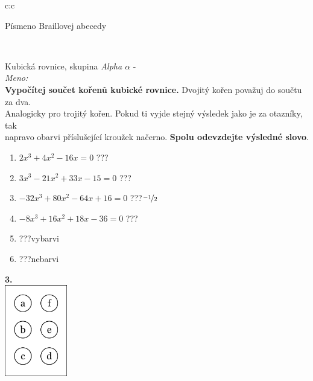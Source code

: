 \documentclass[10pt]{report}
\begin{document}
\begin{tabular}{c:c}
\begin{minipage}[c][99mm][t]{0.49\linewidth}
\begin{center}
\begin{minipage}{0.20\linewidth}
\begin{center}
{\small Písmeno Braillovej abecedy}
\end{center}
\end{minipage}
\end{center}
\end{minipage}
\\ \hdashline
\begin{minipage}[c][99mm][t]{0.49\linewidth}
\begin{center}
\vspace{7mm}
{\huge Kubická rovnice, skupina \textit{Alpha $\alpha$} -}\\[4.5mm]
\textit{Meno:}\phantom{xxxxxxxxxxxxxxxxxxxxxxxxxxxxxxxxxxxxxxxxxxxxxxxxxxxxxxxxxxxxxxxxx}\\[3.5mm]
\textbf{Vypočítej součet kořenů kubické rovnice.} Dvojitý kořen považuj do součtu za dva.\\Analogicky pro trojitý kořen. Pokud ti vyjde stejný výsledek jako je za otazníky, tak\\napravo obarvi příslušející kroužek načerno. \textbf{Spolu odevzdejte výsledné slovo}.\\[3mm]
\begin{minipage}{0.77\linewidth}
\begin{center}
\begin{varwidth}{\textwidth}
\begin{enumerate}
\large
\item $2x^3+4x^2-16x=0$\quad \dotfill\; ???\;\dotfill {}
\item $3x^3-21x^2+33x-15=0$\quad \dotfill\; ???\;\dotfill {}
\item $-32x^3+80x^2-64x+16=0$\quad \dotfill\; ???\;\dotfill \quad $\nicefrac{-1}{2}$
\item $-8x^3+16x^2+18x-36=0$\quad \dotfill\; ???\;\dotfill {}
\item \quad \dotfill\; ???\;\dotfill \quad vybarvi
\item \quad \dotfill\; ???\;\dotfill \quad nebarvi
\end{enumerate}
\end{varwidth}
\end{center}
\end{minipage}
\begin{minipage}{0.20\linewidth}
\begin{center}
{\Huge\bfseries 3.} \\[2mm]
\includegraphics[height=40mm]{../images/braille.png}

\end{center}
\end{minipage}
\end{center}
\end{minipage}
\end{tabular}
\end{document}
